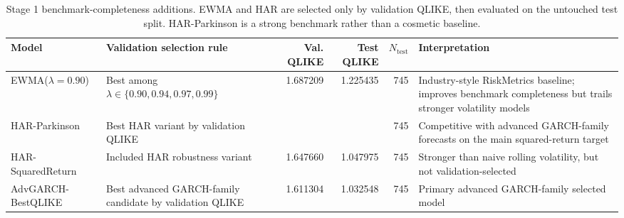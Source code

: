 \begin{table}[!t]
\centering
\caption{Stage 1 benchmark-completeness additions. EWMA and HAR are selected only by validation QLIKE, then evaluated on the untouched test split. HAR-Parkinson is a strong benchmark rather than a cosmetic baseline.}
\label{tab:stage1-baselines}
\scriptsize
\setlength{\tabcolsep}{4pt}
\begin{tabular}{@{}L{0.22\textwidth}L{0.22\textwidth}r r r L{0.24\textwidth}@{}}
\toprule
Model & Validation selection rule & Val. QLIKE & Test QLIKE & \(N_{\mathrm{test}}\) & Interpretation \\
\midrule
EWMA(\(\lambda=0.90\)) & Best among \(\lambda\in\{0.90,0.94,0.97,0.99\}\) & 1.687209 & 1.225435 & 745 & Industry-style RiskMetrics baseline; improves benchmark completeness but trails stronger volatility models \\
HAR-Parkinson & Best HAR variant by validation QLIKE &  &  & 745 & Competitive with advanced GARCH-family forecasts on the main squared-return target \\
HAR-SquaredReturn & Included HAR robustness variant & 1.647660 & 1.047975 & 745 & Stronger than naive rolling volatility, but not validation-selected \\
AdvGARCH-BestQLIKE & Best advanced GARCH-family candidate by validation QLIKE & 1.611304 & 1.032548 & 745 & Primary advanced GARCH-family selected model \\
\bottomrule
\end{tabular}
\end{table}
